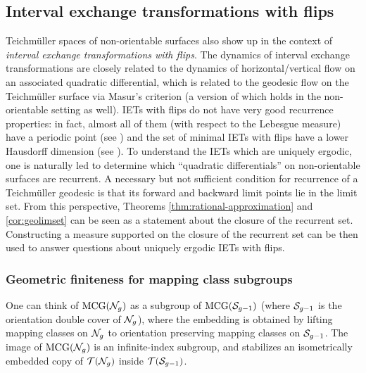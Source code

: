 
\subsection*{Interval exchange transformations with flips}

Teichm\"uller spaces of non-orientable surfaces also show up in the context of \emph{interval exchange transformations with flips}.
The dynamics of interval exchange transformations are closely related to the dynamics of horizontal/vertical flow on an associated quadratic differential, which is related to the geodesic flow on the Teichm\"uller surface via Masur's criterion (a version of which holds in the non-orientable setting as well).
IETs with flips do not have very good recurrence properties: in fact, almost all of them (with respect to the Lebesgue measure) have a periodic point (see \cite{nogueira_1989}) and the set of minimal IETs with flips have a lower Hausdorff dimension (see \cite{skripchenko2018hausdorff}).
To understand the IETs which are uniquely ergodic, one is naturally led to determine which ``quadratic differentials'' on non-orientable surfaces are recurrent.
A necessary but not sufficient condition for recurrence of a Teichm\"uller geodesic is that its forward and backward limit points lie in the limit set.
From this perspective, Theorems \ref{thm:rational-approximation} and \ref{cor:geolimset} can
be seen as a statement about the closure of the recurrent set.
Constructing a measure supported on the closure of the recurrent set can be then used to answer questions about uniquely ergodic IETs with flips.

\subsubsection*{Geometric finiteness for mapping class subgroups}

One can think of $\mathrm{MCG}(\mathcal{N}_g)$ as a subgroup of $\mathrm{MCG}(\mathcal{S}_{g-1})$ (where $\mathcal{S}_{g-1}$ is the orientation double cover of $\mathcal{N}_g$), where the embedding is obtained by lifting mapping classes on $\mathcal{N}_g$ to orientation preserving mapping classes on $\mathcal{S}_{g-1}$.
The image of $\mathrm{MCG}(\mathcal{N}_g)$ is an infinite-index subgroup, and stabilizes an isometrically embedded copy of $\mathcal{T}(\mathcal{N}_g)$ inside $\mathcal{T}(\mathcal{S}_{g-1})$.


